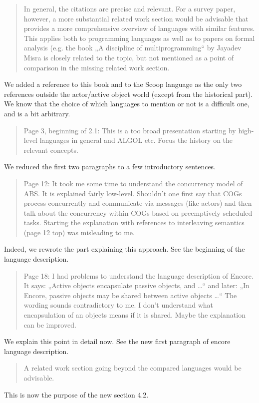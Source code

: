 \documentclass{article}
\begin{document}
\begin{quote}
	In general, the citations are precise and relevant. For a survey paper, however, a 
	more 
substantial related work section would be advisable that provides a more comprehensive 
overview of languages with similar features. This applies both to programming languages 
as well as to papers on formal analysis (e.g. the book „A discipline of multiprogramming“ 
by Jayadev Misra is closely related to the topic, but not mentioned as a point of 
comparison in the missing related work section. 
\end{quote}
We added a reference to this book and to the Scoop language as the only two references 
outside the actor/active object world (except from the historical part). We know that the 
choice of which languages to mention or not is a difficult one, and is a bit arbitrary.

\begin{quote}
 Page 3, beginning of 2.1: This is a too broad presentation starting by high-level 
languages in general and ALGOL etc. Focus the history on the relevant concepts.
\end{quote}
We reduced the first two paragraphs to a few introductory sentences.


\begin{quote}
Page 12: It took me some time to understand the concurrency model of ABS. It is 
explained fairly low-level. Shouldn’t one first say that COGs process concurrently and 
communicate via messages (like actors) and then talk about the concurrency within COGs 
based on preemptively scheduled tasks. Starting the explanation with references to 
interleaving semantics (page 12 top) was misleading to me. 
\end{quote}
Indeed, we rewrote the part explaining this approach. See the beginning of the language 
description.

\begin{quote} Page 18: I had problems to understand the language description of Encore. 
It says: 
„Active objects encapsulate passive objects, and …“ and later: „In Encore, passive 
objects may be shared between active objects …“ The wording sounds contradictory to me. I 
don’t understand what encapsulation of an objects means if it is shared. Maybe the 
explanation can be improved.
\end{quote}
We explain this point in detail now.
See the new first paragraph of encore language description.


\begin{quote}
 A related work section going beyond the compared languages would be advisable.
\end{quote}
This is now the purpose of the new section 4.2.
\end{document}
